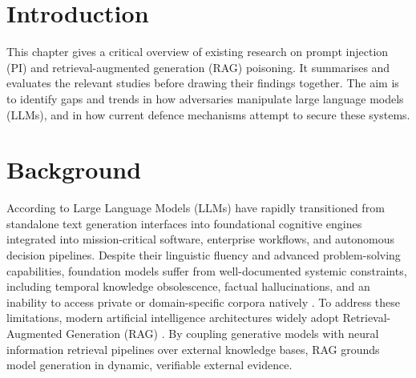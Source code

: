 
\section{Introduction}

This chapter gives a critical overview of existing research on prompt injection
 (PI) and retrieval-augmented generation (RAG) poisoning. It summarises and 
 evaluates the relevant studies before drawing their findings together. 
 The aim is to identify gaps and trends in how adversaries manipulate large 
 language models (LLMs), and in how current defence mechanisms attempt to 
 secure these systems.

\section{Background}

According to \citet{correia_systematic_2026, greshake_not_2023} Large Language Models (LLMs) 
have rapidly transitioned from standalone text generation interfaces into 
foundational cognitive engines integrated into mission-critical software, 
enterprise workflows, and autonomous decision pipelines. Despite their linguistic fluency and advanced problem-solving capabilities,
foundation models suffer from well-documented systemic constraints,
including temporal knowledge obsolescence, factual hallucinations, 
and an inability to access private or domain-specific corpora natively 
\citet{zou_poisonedrag_2025,zhang_benchmarking_2025}.
To address these limitations, modern artificial intelligence
architectures widely adopt Retrieval-Augmented Generation (RAG) 
\citet{lewis2021retrievalaugmentedgenerationknowledgeintensivenlp}.
By coupling generative models with neural information retrieval pipelines
over external knowledge bases, RAG grounds model generation in dynamic, 
verifiable external evidence.

